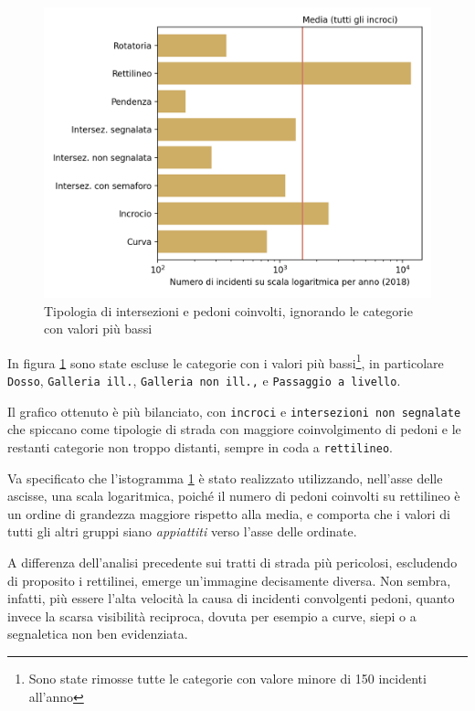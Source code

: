\documentclass[a4paper,12pt]{report}
\newcommand{\columnstyle}[1]{\texttt{#1}}
\newcommand{\quotestyle}[1]{\textit{#1}}
\begin{document}
\begin{figure}
    \includegraphics[width=\linewidth]{../src/incidenti/incidenti_senza_coords/pedoni/pedoni_log.png}
    \caption{Tipologia di intersezioni e pedoni coinvolti, ignorando le categorie con valori più bassi}
    \label{fig:pedoni-no-rett}
\end{figure}

In figura \ref{fig:pedoni-no-rett} sono state 
escluse le categorie con i valori 
più bassi\footnote{Sono state rimosse tutte le categorie con valore minore di 
150 incidenti all'anno}, 
in particolare \columnstyle{Dosso}, \columnstyle{Galleria ill.}, 
\columnstyle{Galleria non ill.,} e \columnstyle{Passaggio a livello}. 

Il grafico ottenuto è più bilanciato, con \columnstyle{incroci} e 
\columnstyle{intersezioni non segnalate} che spiccano come tipologie di strada con 
maggiore coinvolgimento di pedoni e le restanti categorie non troppo distanti, 
sempre in coda a \columnstyle{rettilineo}. 

Va specificato che l'istogramma \ref{fig:pedoni-no-rett} è stato realizzato utilizzando, 
nell'asse delle ascisse, una scala logaritmica, poiché il numero di pedoni coinvolti 
su rettilineo è un ordine di grandezza maggiore rispetto alla media, e 
comporta che i valori di tutti gli altri gruppi siano \quotestyle{appiattiti} 
verso l'asse delle ordinate. 

A differenza dell'analisi precedente sui tratti di strada più pericolosi, 
escludendo di proposito i rettilinei, emerge un'immagine decisamente diversa. 
Non sembra, infatti, più essere l'alta velocità la causa di incidenti convolgenti pedoni, 
quanto invece la scarsa visibilità reciproca, dovuta per esempio a curve, siepi o a 
segnaletica non ben evidenziata.
\end{document}
